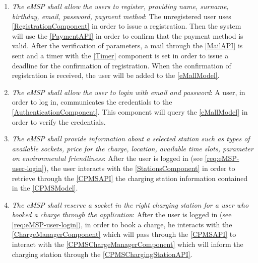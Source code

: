 \begin{enumerate}[label=\textbf{R\arabic*}]
      \item \textit{The \ac{eMSP} shall allow the users to register, providing name, surname, birthday, email, password, payment method}:
            The unregistered user uses \ref{RegistrationComponent} in order to issue a registration.
            Then the system will use the \ref{PaymentAPI} in order to confirm that the payment method is valid.
            After the verification of parameters, a mail through the \ref{MailAPI} is sent and a timer with the \ref{Timer} component is set in order to issue a deadline for the confirmation of registration.
            When the confirmation of registration is received, the user will be added to the \ref{eMallModel}.
            \label{req:eMSP-user-registration}
      \item \textit{The \ac{eMSP} shall allow the user to login with email and password}:
            A user, in order to log in, communicates the credentials to the \ref{AuthenticationComponent}. This component will query the \ref{eMallModel} in order to verify the credentials.
            \label{req:eMSP-user-login}
      \item \textit{The \ac{eMSP} shall provide information about a selected station such as types of available sockets, price for the charge, location, available time slots, parameter on environmental friendliness}:
            After the user is logged in (see \ref{req:eMSP-user-login}), the user interacts with the \ref{StationsComponent} in order to retrieve through the \ref{CPMSAPI} the charging station information contained in the \ref{CPMSModel}.
            \label{req:eMSP-info-station}
      \item \textit{The \ac{eMSP} shall reserve a socket in the right charging station for a user who booked a charge through the application}:
            After the user is logged in (see \ref{req:eMSP-user-login}), in order to book a charge, he interacts with the \ref{ChargeManagerComponent} which will pass through the \ref{CPMSAPI} to interact with the \ref{CPMSChargeManagerComponent} which will inform the charging station through the \ref{CPMSChargingStationAPI}.

\end{enumerate}
